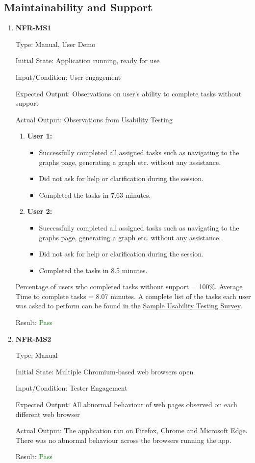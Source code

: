 \documentclass[12pt, titlepage]{article}
\begin{document}
\subsection{Maintainability and Support}
\begin{enumerate}
\item{\textbf{NFR-MS1}} \label{NFR:MS1}

Type: Manual, User Demo

Initial State: Application running, ready for use

Input/Condition: User engagement

Expected Output: Observations on user's ability to complete tasks without
support

Actual Output: \newline
Observations from Usability Testing 
\begin{enumerate}
  \item \textbf{User 1:}
  \begin{itemize}
    \item Successfully completed all assigned tasks such as navigating to the
    graphs page, generating a graph etc. without any assistance.
    \item Did not ask for help or clarification during the session.
    \item Completed the tasks in 7.63 minutes.
  \end{itemize}
  \item \textbf{User 2:}
  \begin{itemize}
    \item Successfully completed all assigned tasks such as navigating to the
    graphs page, generating a graph etc. without any assistance.
    \item Did not ask for help or clarification during the session.
    \item Completed the tasks in 8.5 minutes.
  \end{itemize}
\end{enumerate}
Percentage of users who completed tasks without support = 100\%. Average Time to
complete tasks = 8.07 minutes. A complete list of the tasks each user was asked to 
perform can be found in the \href{https://github.com/SumanyaG/Alkalytics/blob/main/docs/UsabilityTestingReport/Survey/SampleSurvey.pdf}
{Sample Usability Testing Survey}.

Result: \textcolor{green}{Pass}
					
\item{\textbf{NFR-MS2}} \label{NFR:MS2}

Type: Manual

Initial State: Multiple Chromium-based web browsers open

Input/Condition: Tester Engagement

Expected Output: All abnormal behaviour of web pages observed on each different
web browser

Actual Output: The application ran on Firefox, Chrome and Microsoft Edge. There
was no abnormal behaviour across the browsers running the app. 

Result: \textcolor{green}{Pass}
\end{enumerate}
\end{document}
